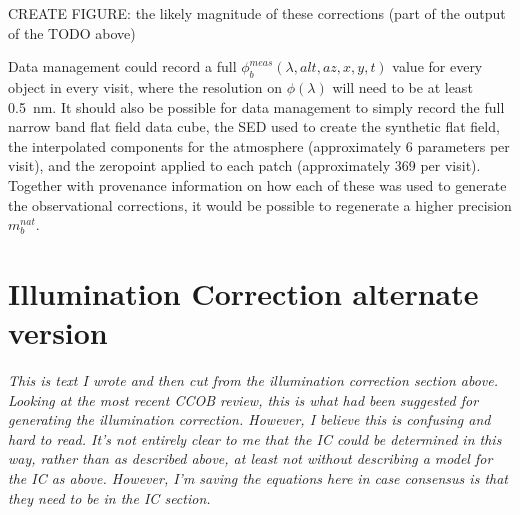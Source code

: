 \documentclass[12pt,preprint]{aastex}
\begin{document}
CREATE FIGURE: the likely magnitude of these corrections (part of the output
of the TODO above)

Data management could record a full $\phi_b^{meas}(\lambda,alt,az,x,y,t)$ value
for every object in every visit, where the resolution on
$\phi(\lambda)$ will need to be at least 0.5~nm.  It should also be possible
for data management to simply record the full narrow band flat field
data cube, the SED used to create the synthetic flat field, 
the interpolated components for the atmosphere (approximately 6
parameters per visit), and the zeropoint applied to each patch
(approximately 369 per visit). Together with provenance information on
how each of these was used to generate the observational corrections,
it would be possible to regenerate a higher precision $m_b^{nat}$. 








\section{Illumination Correction alternate version}

{\it This is text I wrote and then cut from the illumination correction section above.
Looking at the most recent CCOB review, this is what had been suggested for generating
the illumination correction. However, I believe this is confusing and hard to read. 
It's not entirely clear to me that the IC could be determined in this way, rather than
as described above, at least not without describing a model for the IC as above. However,
I'm saving the equations here in case consensus is that they need to be in the IC section.}
\end{document}
